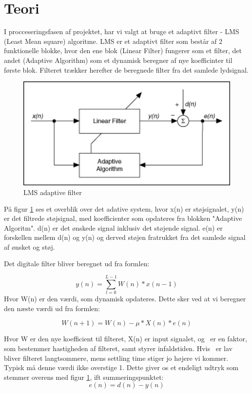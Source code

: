 \graphicspath{{Chapters/Teori/}}


\section{Teori}
I procceseringsfasen af projektet, har vi valgt at bruge et adaptivt filter - LMS (Least Mean square) algoritme. LMS er et adaptivt filter som består af 2 funktionelle blokke, hvor den ene blok (Linear Filter) fungerer som et filter, det andet (Adaptive Algorithm) som et dynamisk beregner af nye koefficinter til første blok.  Filteret trækker herefter de beregnede filter fra det samlede lydsignal. 
   

\begin{figure}[H]
	\centering
	\includegraphics[width = 400pt]{Img/Figures}
	\caption{LMS adaptive filter}
	\label{fig:LMS_filter}
\end{figure}

På figur \ref{fig:LMS_filter} ses et overblik over det adative system, hvor x(n) er støjsignalet, y(n) er det filtrede støjsignal, med koefficienter som opdateres fra blokken "Adaptive Algoritm". d(n) er det ønskede signal inklusiv det støjende signal. e(n) er forskellen mellem d(n) og y(n) og derved støjen fratrukket fra det samlede signal af ønsket og støj.\cite{Teori}  \newline 


Det digitale filter bliver beregnet ud fra formlen:

\begin{equation}
  y(n) = \displaystyle\sum_{l=0}^{L-1} W(n)*x(n-1)
\end{equation}
Hvor W(n) er den værdi, som dynamisk opdateres. Dette sker ved at vi beregner den næste værdi ud fra formlen: 

\begin{equation}
  W(n+1) = W(n)-\mu *X(n)*e(n)
\end{equation}

Hvor W er den nye koefficient til filteret, X(n) er input signalet, og \textmu\ er en faktor, som bestemmer hastigheden af filteret, samt styrer infaldstiden. Hvis \textmu\ er lav bliver filteret langtsommere, mens settling time stiger jo højere vi kommer. Typisk må denne værdi ikke overstige 1. 
\newline
Dette giver os et endeligt udtryk som stemmer overens med figur \ref{fig:LMS_filter}, ift summeringspunktet: 
\begin{equation}
  e(n) = d(n)-y(n)
\end{equation} 
